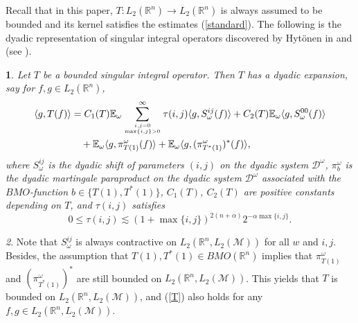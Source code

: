 \documentclass[oneside,english,a4wide]{amsart}
\numberwithin{equation}{section}
\numberwithin{figure}{section}
\theoremstyle{plain}
\newtheorem{thm}{\protect\theoremname}[section]
\theoremstyle{plain}
\theoremstyle{definition}
\theoremstyle{plain}
\theoremstyle{remark}
\newtheorem{rem}[thm]{\protect\remarkname}
\theoremstyle{definition}
\theoremstyle{remark}
\theoremstyle{definition}
\providecommand{\remarkname}{Remark}
\providecommand{\theoremname}{Theorem}
\newcommand{\M}{{\mathcal M}}
\newcommand{\8}{\infty}
\begin{document}
Recall that in this paper, $T:L_2(\mathbb{R}^n)\to L_2(\mathbb{R}^n)$ is always assumed to be bounded and its kernel satisfies the estimates (\ref{standard}). The following is the dyadic representation of singular integral operators discovered by Hyt\"{o}nen in \cite{TH1} and \cite{TH2} (see {\cite[Theorem 3.3]{TH2}}).
\begin{thm}\label{CZdec}
	Let $T$ be a bounded singular integral operator.
	Then $T$ has a dyadic expansion, say for $f,g\in L_2(\mathbb{R}^n)$,
	\begin{equation}\label{T}
		\begin{aligned}
			\langle g,T(f)\rangle{}&=C_1(T)\mathbb{E}_\omega\sum_{i,j=0\atop \max\{i,j\}>0}^\infty \tau(i,j)\langle g,S_\omega^{ij}(f)\rangle+C_2(T)\mathbb{E}_\omega\langle g,S_\omega^{00}(f)\rangle\\&\quad+\mathbb{E}_\omega \langle g,\pi_{T(1)}^\omega (f)\rangle+\mathbb{E}_\omega \langle g,(\pi_{T^*(1)}^\omega)^* (f)\rangle,
		\end{aligned}
	\end{equation}
	where $S_\omega^{ij}$ is the dyadic shift of parameters $(i,j)$ on the dyadic system $\mathcal{D}^\omega$, $\pi_b^\omega$ is the dyadic martingale paraproduct on the dyadic system $\mathcal{D}^\omega$ associated with the $BMO$-function $b\in\{T(1),T^*(1)\}$, $C_1(T)$, $C_2(T)$ are positive constants depending on $T$, and $\tau(i,j)$ satisfies 
	\begin{equation*}
		0\leq \tau(i,j)\lesssim (1+\max\{i,j\})^{2(n+\alpha)}2^{-\alpha \max\{i,j\}}.
	\end{equation*}
\end{thm}

\begin{rem}
	Note that $S_\omega^{ij}$ is always contractive on $L_2(\mathbb{R}^n, L_2(\M))$ for all $w$ and $i, j$. Besides, the assumption that $T(1),T^*(1)\in BMO(\mathbb{R}^n)$ implies that $\pi_{T(1)}^\omega$ and $(\pi_{T^*(1)}^\omega)^* $ are still bounded on $L_2(\mathbb{R}^n, L_2(\M))$. This yields that $T$ is bounded on $L_2(\mathbb{R}^n, L_2(\M))$, and (\ref{T}) also holds for any $f,g\in L_2(\mathbb{R}^n, L_2(\M))$.
\end{rem}
\end{document}
